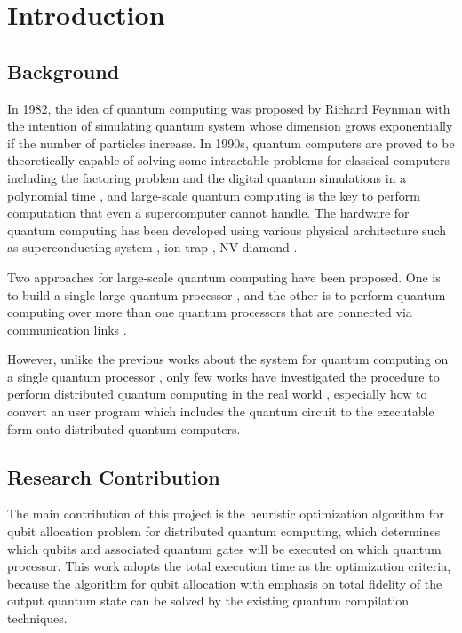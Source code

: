 \chapter{Introduction}
\label{introduction}

\section{Background}
\label{introduction:background}
 In 1982, the idea of quantum computing was proposed by Richard Feynman \cite{Feynman} with the intention of simulating quantum system whose dimension grows exponentially if the number of particles increase.  In 1990s, quantum computers are proved to be theoretically capable of solving some intractable problems for classical computers including the factoring problem \cite{Shor} and the digital quantum simulations in a polynomial time \cite{Lloyd}, and large-scale quantum computing is the key to perform computation that even a supercomputer cannot handle.  The hardware for quantum computing has been developed using various physical architecture such as superconducting system \cite{superconducting}, ion trap \cite{iontrap}, NV diamond \cite{nvdiamond}.
 
  Two approaches for large-scale quantum computing have been proposed. One is to build a single large quantum processor \cite{rsa}, and the other is to perform quantum computing over more than one quantum processors that are connected via communication links \cite{grover}.  
 
 However, unlike the previous works about the system for quantum computing on a single quantum processor \cite{qubitallocation, noisy},  only few works have investigated the procedure to perform distributed quantum computing in the real world \cite{qmpi}, especially how to convert an user program which includes the quantum circuit to the executable form onto distributed quantum computers.

\section{Research Contribution}
\label{introduction:research_contribution}
The main contribution of this project is the heuristic optimization algorithm for qubit allocation problem for distributed quantum computing, which determines which qubits and associated quantum gates will be executed on which quantum processor.  This work adopts the total execution time as the optimization criteria, because the algorithm for qubit allocation with emphasis on total fidelity of the output quantum state can be solved by the existing quantum compilation techniques.　

